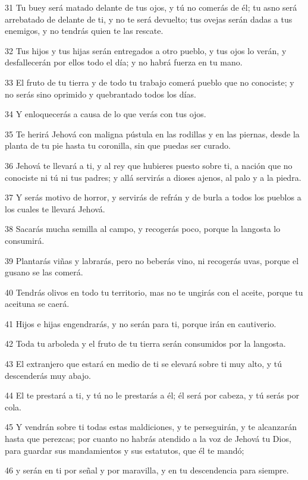 \par 31 Tu buey será matado delante de tus ojos, y tú no comerás de él; tu asno será arrebatado de delante de ti, y no te será devuelto; tus ovejas serán dadas a tus enemigos, y no tendrás quien te las rescate.
\par 32 Tus hijos y tus hijas serán entregados a otro pueblo, y tus ojos lo verán, y desfallecerán por ellos todo el día; y no habrá fuerza en tu mano.
\par 33 El fruto de tu tierra y de todo tu trabajo comerá pueblo que no conociste; y no serás sino oprimido y quebrantado todos los días.
\par 34 Y enloquecerás a causa de lo que verás con tus ojos.
\par 35 Te herirá Jehová con maligna pústula en las rodillas y en las piernas, desde la planta de tu pie hasta tu coronilla, sin que puedas ser curado.
\par 36 Jehová te llevará a ti, y al rey que hubieres puesto sobre ti, a nación que no conociste ni tú ni tus padres; y allá servirás a dioses ajenos, al palo y a la piedra.
\par 37 Y serás motivo de horror, y servirás de refrán y de burla a todos los pueblos a los cuales te llevará Jehová.
\par 38 Sacarás mucha semilla al campo, y recogerás poco, porque la langosta lo consumirá.
\par 39 Plantarás viñas y labrarás, pero no beberás vino, ni recogerás uvas, porque el gusano se las comerá.
\par 40 Tendrás olivos en todo tu territorio, mas no te ungirás con el aceite, porque tu aceituna se caerá.
\par 41 Hijos e hijas engendrarás, y no serán para ti, porque irán en cautiverio.
\par 42 Toda tu arboleda y el fruto de tu tierra serán consumidos por la langosta.
\par 43 El extranjero que estará en medio de ti se elevará sobre ti muy alto, y tú descenderás muy abajo.
\par 44 El te prestará a ti, y tú no le prestarás a él; él será por cabeza, y tú serás por cola.
\par 45 Y vendrán sobre ti todas estas maldiciones, y te perseguirán, y te alcanzarán hasta que perezcas; por cuanto no habrás atendido a la voz de Jehová tu Dios, para guardar sus mandamientos y sus estatutos, que él te mandó;
\par 46 y serán en ti por señal y por maravilla, y en tu descendencia para siempre.
